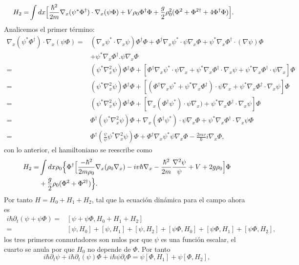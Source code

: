 \begin{align}
H_2=&\int dx \Bigl[\frac{\hbar^2}{2m} \nabla_x(\psi^*\Phi^{\dagger})\cdot\nabla_x(\psi\Phi)+V\rho_0\Phi^{\dagger}\Phi+\frac{g}{2}\rho_0^2(\Phi^2+\Phi^{2\dagger}+4\Phi^{\dagger}\Phi)\Bigr].
\end{align}
Analicemos el primer t\'{e}rmino:
\begin{align}
\nonumber \nabla_x(\psi^*\Phi^{\dagger})\cdot \nabla_x(\psi\Phi)=&(\nabla_x \psi^*\cdot\nabla_x\psi)\Phi^{\dagger}\Phi+\Phi^{\dagger}\nabla_x\psi^*\cdot\psi\nabla_x\Phi+\psi^*\nabla_x\Phi^{\dagger}\cdot(\nabla\psi)\Phi\\
\nonumber &+\psi^*\nabla_x\Phi^{\dagger}.\psi\nabla_x\Phi\\
\nonumber=&(\psi^*\nabla_x^2\psi)\Phi^{\dagger}\Phi+[\Phi^{\dagger}\nabla_x \psi^*\cdot\psi\nabla_x+\psi^*\nabla_x\Phi^{\dagger}\cdot\nabla_x\psi+\psi^*\nabla_x\Phi^{\dagger}\cdot\psi\nabla_x]\Phi\\
\nonumber=&(\psi^*\nabla_x^2\psi)\Phi^{\dagger}\Phi+[(\Phi^{\dagger}\nabla_x \psi^*+\psi^*\nabla_x\Phi^{\dagger})\cdot\psi\nabla_x+\psi^*\nabla_x\Phi^{\dagger}\cdot\nabla_x \psi]\Phi\\
\nonumber=&(\psi^*\nabla_x^2\psi)\Phi^{\dagger}\Phi+[\nabla_x(\Phi^{\dagger}\psi^*)\cdot\psi\nabla_x)+\psi^*\nabla_x\Phi^{\dagger}\cdot\nabla_x\psi]\Phi\\
\nonumber=&\Phi^{\dagger}(\psi^*\nabla_x^2\psi)\Phi+\nabla_x(\Phi^{\dagger}\psi^*)\cdot\psi\nabla_x\Phi+\psi^*\nabla_x\Phi^{\dagger}\cdot\nabla_x\psi\Phi\\
=&\Phi^{\dagger}(\frac{\psi}{\psi}\psi^*\nabla_x^2\psi)\Phi+\Phi^{\dagger}\nabla_x \psi^*\psi\nabla_x\Phi-\frac{2mv}{\hbar}i\nabla_x \Phi,
\end{align}
con lo anterior, el hamiltoniano se reescribe como
\begin{align}
\nonumber H_2=&\int dx \rho_0\Bigl\{\Phi^{\dagger}\Bigl[\frac{-\hbar^2}{2m\rho_0} \nabla_x(\rho_0\nabla_x)-iv\hbar\nabla_x-\frac{\hbar^2}{2m}\frac{\nabla^2\psi}{\psi}+V+2g\rho_0\Bigr]\Phi\\
\nonumber &+\frac{g}{2}\rho_0(\Phi^2+\Phi^{2\dagger})\Bigr\}.
\end{align}
Por tanto $H=H_0+H_1+H_2$, tal que la ecuaci\'{o}n din\'{a}mica para el campo ahora es
\begin{align}
\nonumber i\hbar\partial_t(\psi+\psi\Phi)=&[\psi+\psi\Phi,H_0+H_1+H_2]\\
=&[\psi,H_0]+[\psi,H_1]+[\psi,H_2]+[\psi\Phi,H_0]+[\psi\Phi,H_1]+[\psi\Phi,H_2],
\end{align}
los tres primeros conmutadores son nulos por que $\psi$ es una funci\'{o}n escalar, el cuarto se anula por que $H_0$ no depende de $\Phi$. Por tanto
\begin{equation}
i\hbar \partial_t \psi+i\hbar\partial_t(\psi)\Phi+i\hbar\psi\partial_t\Phi=\psi[\Phi,H_1]+\psi[\Phi,H_2],
\end{equation}

